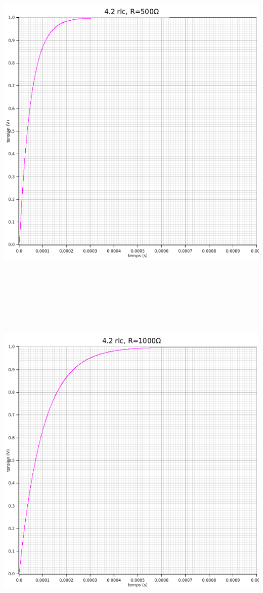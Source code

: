 \documentclass{article}
\begin{document}
{\begin{center}
    \end{center}
    \begin{center}
      \includegraphics[height=45em]{images/rlc500.png}
    \end{center}
    \begin{center}
      \includegraphics[height=45em]{images/rlc1000.png}

\end{center}}
\end{document}
